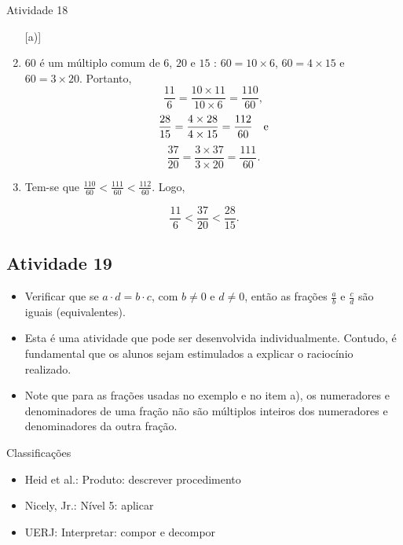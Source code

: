 \begin{multicols}{2}
\begin{resposta*}{Atividade 18}
\begin{enumerate} [\quad a)] %
    \item             $60$       é um múltiplo comum de       $6$,       $20$    
   e       $15$      :       $60 = 10 \times 6$,       $60 = 4 \times 15$       
e       $60 = 3 \times 20$. Portanto,       $$\frac{11}{6} = \frac{10 \times 
11}{10 \times 6} = \frac{110}{60},$$             $$\frac{28}{15} = \frac{4 
\times 28}{4 \times 15} = \frac{112}{60} \quad {\rm  e}$$             
$$\frac{37}{20} = \frac{3 \times 37}{3 \times 20} = \frac{111}{60}.$$      
\mbox{} \newline 
    \item       Tem-se que       $\frac{110}{60} < \frac{111}{60} < 
\frac{112}{60}$. Logo,
\end{enumerate} %
  
  $$\frac{11}{6} < \frac{37}{20} < \frac{28}{15}.$$  
\end{resposta*}

\subsection{Atividade 19}

\begin{itemize} %
    \item       Verificar que se       $a \cdot d = b \cdot c$, com       $b 
\not = 0$       e       $d \not = 0$, então as frações       $\frac{a}{b}$       
e       $\frac{c}{d}$       são iguais (equivalentes).
\end{itemize} %
  
  
 
\begin{itemize} %
    \item       Esta é uma atividade que pode ser desenvolvida individualmente. 
Contudo, é fundamental que os alunos sejam estimulados a explicar o raciocínio 
realizado.
    \item       Note que para as frações usadas no exemplo e no item a), os 
numeradores e denominadores de uma fração não são múltiplos inteiros dos 
numeradores e denominadores da outra fração.
\end{itemize} %
  
  
  Classificações  
\begin{itemize} %
    \item       Heid et al.: Produto: descrever procedimento
    \item       Nicely, Jr.: Nível 5: aplicar
    \item       UERJ: Interpretar: compor e decompor
\end{itemize} %


\end{multicols}
